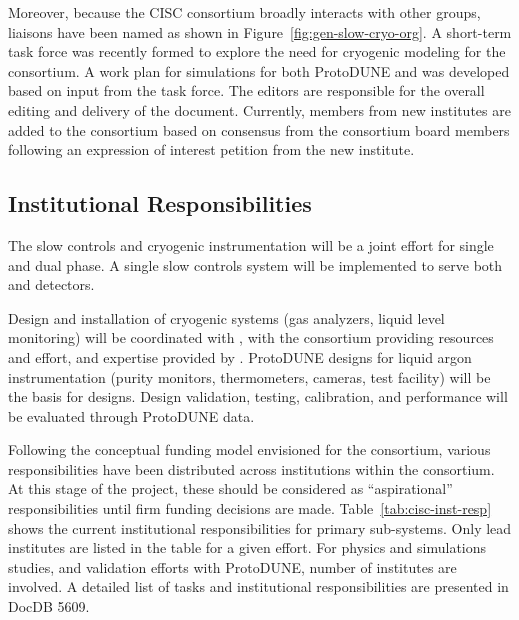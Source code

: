 Moreover, because the CISC consortium broadly interacts with other groups, liaisons have been named as shown in Figure~\ref{fig:gen-slow-cryo-org}. 
A short-term task force was recently formed to explore the need for cryogenic modeling for the consortium. A work plan for  simulations for both ProtoDUNE and  was developed based on input from the task force. The  editors are responsible for the overall editing and delivery of the  document. Currently, members from new institutes are added to the consortium based on consensus from the consortium board members following an expression of interest petition from the new institute.

\subsection{Institutional Responsibilities}

The slow controls and cryogenic instrumentation will be a joint effort for single and dual phase. A single slow controls system will be implemented to serve both  and  detectors.

Design and installation of cryogenic systems (gas analyzers, liquid level monitoring) will be coordinated with , with the consortium providing resources and effort, and expertise provided by . ProtoDUNE designs for liquid argon instrumentation (purity monitors, thermometers, cameras, test facility) will be the basis for  designs. Design validation, testing, calibration, and performance will be evaluated through ProtoDUNE data.

Following the conceptual funding model envisioned for the consortium, various responsibilities have been distributed across institutions within the consortium. At this stage of the project, these should be considered as ``aspirational'' responsibilities until firm funding decisions are made. Table~\ref{tab:cisc-inst-resp} shows the current institutional responsibilities for primary  sub-systems. Only lead institutes are listed in the table for a given effort. For physics and simulations studies, and validation efforts with ProtoDUNE, number of institutes are involved. A detailed list of tasks and institutional responsibilities are presented in  DocDB 5609.

